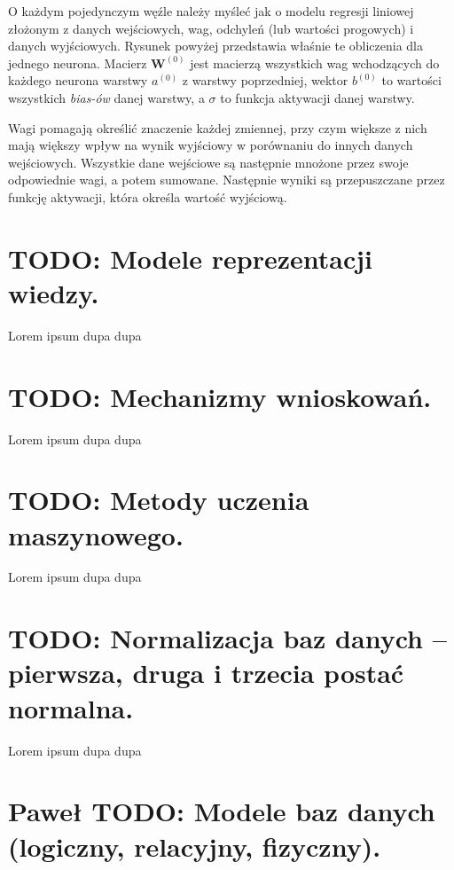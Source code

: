 \documentclass[a4paper,12pt,oneside]{book}
\begin{document}
						O każdym pojedynczym węźle należy myśleć jak o modelu regresji liniowej złożonym z danych wejściowych, wag, odchyleń (lub wartości progowych) i danych wyjściowych. Rysunek powyżej przedstawia właśnie te obliczenia dla jednego neurona. Macierz $\mathbf{W}^{(0)}$ jest macierzą wszystkich wag wchodzących do każdego neurona warstwy $a^{(0)}$ z warstwy poprzedniej, wektor $b^(0)$ to wartości wszystkich \textit{bias-ów} danej warstwy, a $\sigma$ to funkcja aktywacji danej warstwy.
						
						Wagi pomagają określić znaczenie każdej zmiennej, przy czym większe z nich mają większy wpływ na wynik wyjściowy w porównaniu do innych danych wejściowych. Wszystkie dane wejściowe są następnie mnożone przez swoje odpowiednie wagi, a potem sumowane. Następnie wyniki są przepuszczane przez funkcję aktywacji, która określa wartość wyjściową.
		
		\setcounter{section}{29}
		\section{\color{red} TODO: Modele reprezentacji wiedzy.}
				
				Lorem ipsum dupa dupa
		
		\setcounter{section}{30}
		\section{\color{red} TODO: Mechanizmy wnioskowań. }
				
				Lorem ipsum dupa dupa
		
		\setcounter{section}{31}
		\section{\color{red} TODO: Metody uczenia maszynowego.} 
				
				Lorem ipsum dupa dupa
		
		\setcounter{section}{33}
		\section{\color{red} TODO: Normalizacja baz danych – pierwsza, druga i trzecia postać normalna. }
				
				Lorem ipsum dupa dupa
		
		\setcounter{section}{34}
		\section{\color{green}Paweł \color{red} TODO: Modele baz danych (logiczny, relacyjny, fizyczny). }
				
\end{document}

